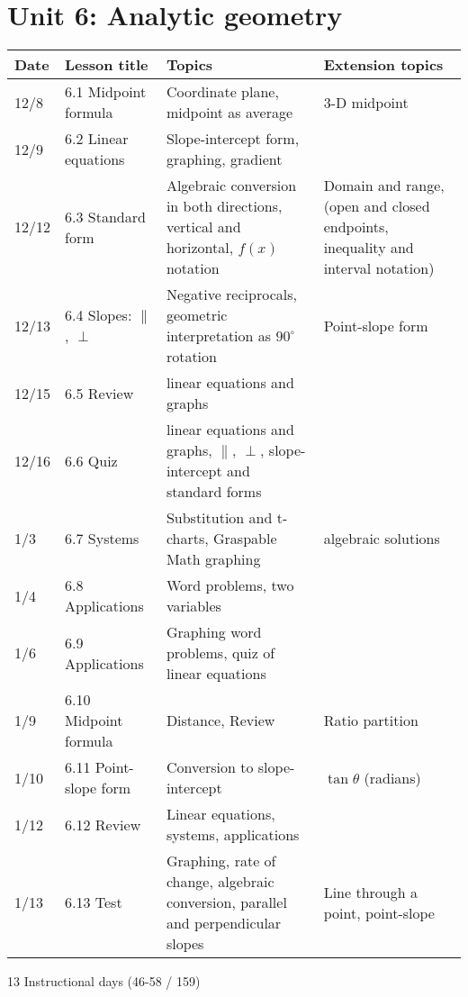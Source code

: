 \documentclass[12pt, twoside]{article}
\begin{document}
\section*{Unit 6: Analytic geometry}
\begin{tabular}{|p{0.9cm}|p{4cm}|p{7cm}|p{5cm}|}
  \hline
  Date & Lesson title & Topics  & Extension topics \\
  \hline
  12/8 & 6.1 Midpoint formula & Coordinate plane, midpoint as average & 3-D midpoint \\
  \hline
  12/9 & 6.2 Linear equations & Slope-intercept form, graphing, gradient &  \\
  \hline
  12/12 & 6.3 Standard form & Algebraic conversion in both directions, vertical and horizontal, $f(x)$ notation & Domain and range, (open and closed endpoints, inequality and interval notation) \\
  \hline
  12/13 & 6.4 Slopes: $\parallel$, $\perp$ & Negative reciprocals, geometric interpretation as $90^\circ$ rotation & Point-slope form \\
  \hline
  12/15 & 6.5 Review & linear equations and graphs &  \\
  \hline
  12/16 & 6.6 Quiz & linear equations and graphs, $\parallel$, $\perp$, slope-intercept and standard forms & \\
  \hline
  1/3 & 6.7 Systems & Substitution and t-charts, Graspable Math graphing & algebraic solutions \\
  \hline
  1/4 & 6.8 Applications & Word problems, two variables &  \\
  \hline
  1/6 & 6.9 Applications & Graphing word problems, quiz of linear equations &  \\
  \hline
  1/9 & 6.10 Midpoint formula & Distance, Review & Ratio partition \\
  \hline
  1/10 & 6.11 Point-slope form & Conversion to slope-intercept & $\tan \theta$ (radians) \\
  \hline
  1/12 & 6.12 Review & Linear equations, systems, applications &  \\
  \hline
  1/13 & 6.13 Test & Graphing, rate of change, algebraic conversion, parallel and perpendicular slopes & Line through a point, point-slope \\
  \hline

\end{tabular} \par \vspace*{0.3cm}
13 Instructional days (46-58 / 159)
\end{document}
